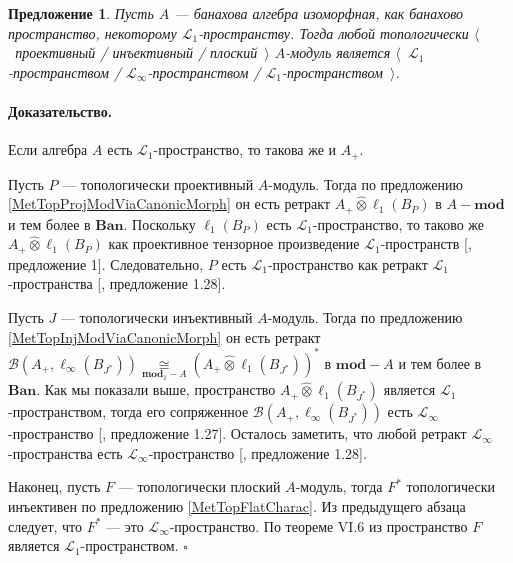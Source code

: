 \documentclass[12pt]{article}
\newcommand{\projtens}{\mathbin{\widehat{\otimes}}}
\newcommand{\isom}[1]{\mathop{\mathbin{\cong}}\limits_{#1}}
\newtheorem{proposition}[theorem]{Предложение}
\renewenvironment{proof}{\paragraph{Доказательство.}}{\hfill$\square$\medskip}
\begin{document}
\begin{proposition}\label{TopProjInjFlatModOverMthscrL1SpCharac} Пусть $A$ --- банахова алгебра изоморфная, как банахово пространство, некоторому $\mathscr{L}_1$-пространству. Тогда любой топологически $\langle$~проективный / инъективный / плоский~$\rangle$ $A$-модуль является $\langle$~$\mathscr{L}_1$-пространством / $\mathscr{L}_\infty$-пространством / $\mathscr{L}_1$-пространством~$\rangle$.
\end{proposition}
\begin{proof} Если алгебра $A$ есть $\mathscr{L}_1$-пространство, то такова же и $A_+$. 

Пусть $P$ --- топологически проективный $A$-модуль. Тогда по предложению \ref{MetTopProjModViaCanonicMorph} он есть ретракт $A_+\projtens \ell_1(B_P)$ в $A-\mathbf{mod}$ и тем более в $\mathbf{Ban}$. Поскольку $\ell_1(B_P)$ есть $\mathscr{L}_1$-пространство, то таково же $A_+\projtens\ell_1(B_P)$ как проективное тензорное произведение $\mathscr{L}_1$-пространств [\cite{GonzDPPInTensProd}, предложение 1]. Следовательно, $P$ есть $\mathscr{L}_1$-пространство как ретракт $\mathscr{L}_1$-пространства [\cite{BourgNewClOfLpSp}, предложение 1.28].

Пусть $J$ --- топологически инъективный $A$-модуль. Тогда по предложению \ref{MetTopInjModViaCanonicMorph} он есть ретракт $\mathcal{B}(A_+,\ell_\infty(B_{J^*}))\isom{\mathbf{mod}_1-A}(A_+\projtens\ell_1(B_{J^*}))^*$ в $\mathbf{mod}-A$ и тем более в $\mathbf{Ban}$. Как мы показали выше, пространство $A_+\projtens\ell_1(B_{J^*})$ является $\mathscr{L}_1$-пространством, тогда его сопряженное $\mathcal{B}(A_+,\ell_\infty(B_{J^*}))$ есть $\mathscr{L}_\infty$-пространство [\cite{BourgNewClOfLpSp}, предложение 1.27]. Осталось заметить, что любой ретракт $\mathscr{L}_\infty$-пространства есть $\mathscr{L}_\infty$-пространство [\cite{BourgNewClOfLpSp}, предложение 1.28].

Наконец, пусть $F$ --- топологически плоский $A$-модуль, тогда $F^*$ топологически инъективен по предложению \ref{MetTopFlatCharac}. Из предыдущего абзаца следует, что $F^*$ --- это $\mathscr{L}_\infty$-пространство. По теореме VI.6 из \cite{StegRethNucOpL1LInfSp} пространство $F$ является $\mathscr{L}_1$-пространством.
\end{proof}
\end{document}
